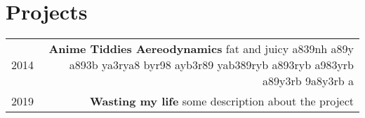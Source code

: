 \section*{Projects}
\begin{tabular}{L!{\VRule}R}
  2014&\textbf{Anime Tiddies Aereodynamics} fat and juicy a839nh a89y a893b ya3rya8 byr98 ayb3r89 yab389ryb a893ryb a983yrb a89y3rb 9a8y3rb a\\
  2019&\textbf{Wasting my life} some description about the project
\end{tabular}
